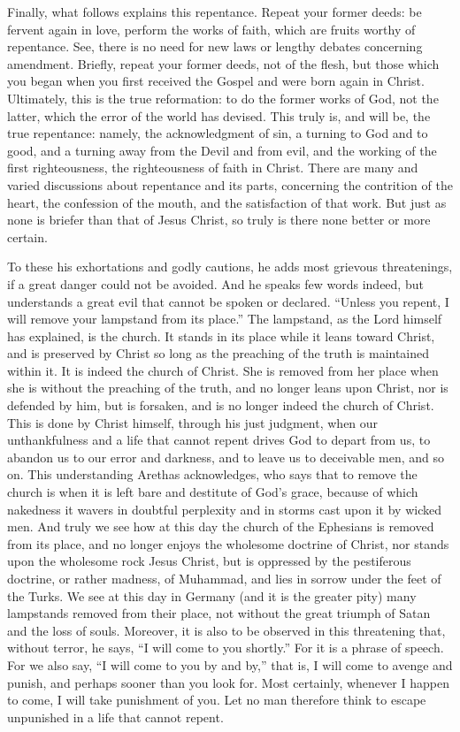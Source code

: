 Finally, what follows explains this repentance. Repeat your former deeds: be fervent again in love, perform the works of faith, which are fruits worthy of repentance. See, there is no need for new laws or lengthy debates concerning amendment. Briefly, repeat your former deeds, not of the flesh, but those which you began when you first received the Gospel and were born again in Christ. Ultimately, this is the true reformation: to do the former works of God, not the latter, which the error of the world has devised. This truly is, and will be, the true repentance: namely, the acknowledgment of sin, a turning to God and to good, and a turning away from the Devil and from evil, and the working of the first righteousness, the righteousness of faith in Christ. There are many and varied discussions about repentance and its parts, concerning the contrition of the heart, the confession of the mouth, and the satisfaction of that work. But just as none is briefer than that of Jesus Christ, so truly is there none better or more certain.

To these his exhortations and godly cautions, he adds most grievous threatenings, if a great danger could not be avoided. And he speaks few words indeed, but understands a great evil that cannot be spoken or declared. “Unless you repent, I will remove your lampstand from its place.” The lampstand, as the Lord himself has explained, is the church. It stands in its place while it leans toward Christ, and is preserved by Christ so long as the preaching of the truth is maintained within it. It is indeed the church of Christ. She is removed from her place when she is without the preaching of the truth, and no longer leans upon Christ, nor is defended by him, but is forsaken, and is no longer indeed the church of Christ. This is done by Christ himself, through his just judgment, when our unthankfulness and a life that cannot repent drives God to depart from us, to abandon us to our error and darkness, and to leave us to deceivable men, and so on. This understanding Arethas acknowledges, who says that to remove the church is when it is left bare and destitute of God’s grace, because of which nakedness it wavers in doubtful perplexity and in storms cast upon it by wicked men. And truly we see how at this day the church of the Ephesians is removed from its place, and no longer enjoys the wholesome doctrine of Christ, nor stands upon the wholesome rock Jesus Christ, but is oppressed by the pestiferous doctrine, or rather madness, of Muhammad, and lies in sorrow under the feet of the Turks. We see at this day in Germany (and it is the greater pity) many lampstands removed from their place, not without the great triumph of Satan and the loss of souls. Moreover, it is also to be observed in this threatening that, without terror, he says, “I will come to you shortly.” For it is a phrase of speech. For we also say, “I will come to you by and by,” that is, I will come to avenge and punish, and perhaps sooner than you look for. Most certainly, whenever I happen to come, I will take punishment of you. Let no man therefore think to escape unpunished in a life that cannot repent.

